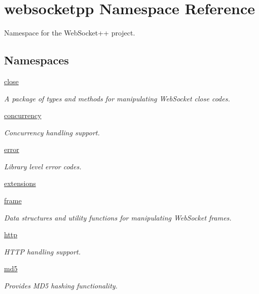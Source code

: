 \hypertarget{namespacewebsocketpp}{}\section{websocketpp Namespace Reference}
\label{namespacewebsocketpp}


Namespace for the Web\+Socket++ project.  


\subsection*{Namespaces}
\begin{DoxyCompactItemize}
\item 
 \hyperlink{namespacewebsocketpp_1_1close}{close}
\begin{DoxyCompactList}\small\item\em A package of types and methods for manipulating Web\+Socket close codes. \end{DoxyCompactList}\item 
 \hyperlink{namespacewebsocketpp_1_1concurrency}{concurrency}
\begin{DoxyCompactList}\small\item\em Concurrency handling support. \end{DoxyCompactList}\item 
 \hyperlink{namespacewebsocketpp_1_1error}{error}
\begin{DoxyCompactList}\small\item\em Library level error codes. \end{DoxyCompactList}\item 
 \hyperlink{namespacewebsocketpp_1_1extensions}{extensions}
\item 
 \hyperlink{namespacewebsocketpp_1_1frame}{frame}
\begin{DoxyCompactList}\small\item\em Data structures and utility functions for manipulating Web\+Socket frames. \end{DoxyCompactList}\item 
 \hyperlink{namespacewebsocketpp_1_1http}{http}
\begin{DoxyCompactList}\small\item\em H\+T\+TP handling support. \end{DoxyCompactList}\item 
 \hyperlink{namespacewebsocketpp_1_1md5}{md5}
\begin{DoxyCompactList}\small\item\em Provides M\+D5 hashing functionality. \end{DoxyCompactList}\item 

\end{DoxyCompactItemize}
